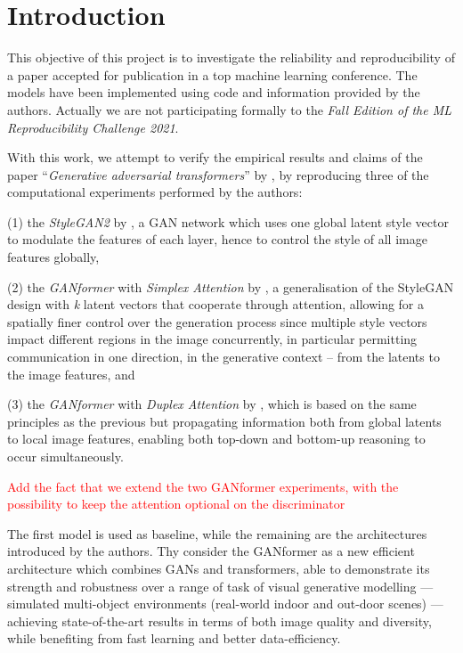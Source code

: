 \documentclass{article}
\begin{document}
	\section{Introduction}
	This objective of this project is to investigate the reliability and reproducibility of a paper accepted 
	for publication in a top machine learning conference.
	The models have been implemented using code and information provided by the authors.	
	Actually we are not participating formally to the \textit{Fall Edition of the ML Reproducibility 
	Challenge 2021}.
	
	With this work, we attempt to verify the empirical results and claims of the paper ``\emph{Generative 
	adversarial transformers}'' by \citet{hudson2021generative}, by reproducing three of the 
	computational experiments performed by the authors:
	\begin{enumerate*}
		\item[(1)] the \textit{StyleGAN2} by \citet{karras2020analyzing,karras2019style}, a GAN 
		network which uses one 
		global latent style vector to modulate the features of each layer, hence to control the style of all 
		image features globally,
		\item[(2)] the \textit{GANformer} with \textit{Simplex Attention} by 
		\citet{hudson2021generative}, a generalisation of the StyleGAN design with \textit{k} latent 
		vectors that cooperate through attention, allowing for a spatially finer control over the generation 
		process since multiple style vectors impact different regions in the image concurrently, in 
		particular permitting communication in one direction, in the generative context – from the latents 
		to the image features, and
		\item[(3)] the \textit{GANformer} with \textit{Duplex Attention} by \citet{hudson2021generative}, 
		which is based on the same principles as the previous but propagating information both from 
		global latents to local image features, enabling both top-down and bottom-up reasoning to occur 
		simultaneously.
	\end{enumerate*} 

	\textcolor{red}{Add the fact that we extend the two GANformer experiments, with the possibility to 
	keep the attention optional on the discriminator}
	
	The first model is used as baseline, while the remaining are the architectures introduced by the 
	authors. Thy consider the GANformer as a new efficient architecture which combines GANs and 
	transformers, able to demonstrate its strength and robustness over a range of task of visual 
	generative modelling —  simulated multi-object environments (real-world indoor and out-door 
	scenes) — achieving state-of-the-art results in terms of both image quality and diversity, while 
	benefiting from fast learning and better data-efficiency. 
	
\end{document}
